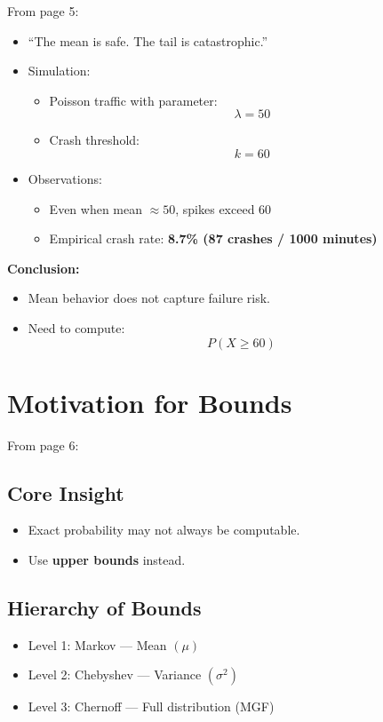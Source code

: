 \documentclass[11pt]{article}
\begin{document}
From page 5:

\begin{itemize}
\item ``The mean is safe. The tail is catastrophic.''

\item Simulation:
\begin{itemize}
\item Poisson traffic with parameter:
\[
\lambda = 50
\]
\item Crash threshold:
\[
k = 60
\]
\end{itemize}

\item Observations:
\begin{itemize}
\item Even when mean $\approx 50$, spikes exceed 60
\item Empirical crash rate: \textbf{8.7\% (87 crashes / 1000 minutes)}
\end{itemize}
\end{itemize}

\textbf{Conclusion:}

\begin{itemize}
\item Mean behavior does not capture failure risk.
\item Need to compute:
\[
P(X \ge 60)
\]
\end{itemize}

\section{Motivation for Bounds}

From page 6:

\subsection{Core Insight}

\begin{itemize}
\item Exact probability may not always be computable.
\item Use \textbf{upper bounds} instead.
\end{itemize}

\subsection{Hierarchy of Bounds}

\begin{itemize}
\item Level 1: Markov --- Mean $(\mu)$
\item Level 2: Chebyshev --- Variance $(\sigma^2)$
\item Level 3: Chernoff --- Full distribution (MGF)
\end{itemize}
\end{document}
